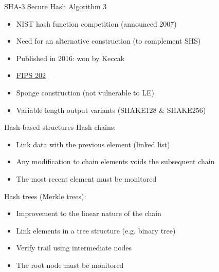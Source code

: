 \begin{frame}{SHA-3}
  Secure Hash Algorithm 3
  \begin{itemize}[<+(1)->]
    \item NIST hash function competition (announced 2007)
    \item Need for an alternative construction (to complement SHS)
    \item Published in 2016: won by Keccak
    \item \href{https://csrc.nist.gov/pubs/fips/202/final}{FIPS 202}
    \item Sponge construction (not vulnerable to LE)
    \item Variable length output variants (SHAKE128 \& SHAKE256)
  \end{itemize}
\end{frame}

\begin{frame}{Hash-based structures}
  Hash chains:
  \begin{itemize}[<+(1)->]
    \item Link data with the previous element (linked list)
    \item Any modification to chain elements voids the subsequent chain
    \item The most recent element must be monitored
  \end{itemize}

  \pause
  Hash trees (Merkle trees):
  \begin{itemize}[<+(1)->]
    \item Improvement to the linear nature of the chain
    \item Link elements in a tree structure (e.g. binary tree)
    \item Verify trail using intermediate nodes
    \item The root node must be monitored
  \end{itemize}
\end{frame}

